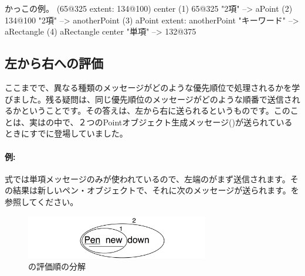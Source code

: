 \documentclass[a4paper,10pt,twoside]{book}
\begin{document}
\begin{example}[decExtent]{かっこの例。}{}
      (65@325 extent: 134@100) center
(1)   65@325                                                    "2項"
    --> aPoint
(2)                                134@100                     "2項"
                                 --> anotherPoint
(3)   aPoint extent: anotherPoint                       "キーワード"
      --> aRectangle
(4)   aRectangle center                                     "単項"
      --> 132@375
\end{example}

\subsection{左から右への評価}
ここまでで、異なる種類のメッセージがどのような優先順位で処理されるかを学びました。残る疑問は、同じ優先順位のメッセージがどのような順番で送信されるかということです。その答えは、左から右に送られるというものです。このことは、実はの中で、２つのPointオブジェクト生成メッセージ()が送られているときにすでに登場していました。



\paragraph{例:} 式では単項メッセージのみが使われているので、左端のがまず送信されます。その結果は新しいペン・オブジェクトで、それに次のメッセージが送られます。を参照してください。

\begin{figure}
	\centering
	\includegraphics[width=8cm]{ucompoUn}
	\caption{の評価順の分解}
\end{figure}
\end{document}
